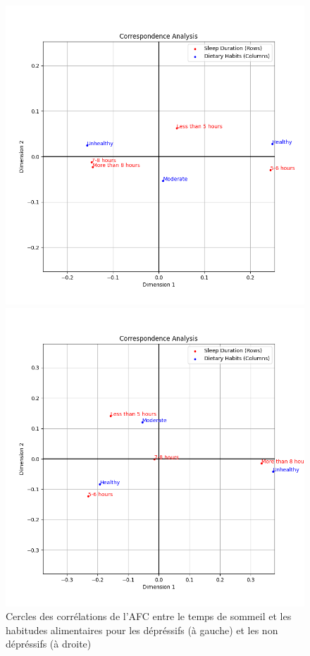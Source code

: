 \begin{figure}[!h]
  \centering
  \begin{minipage}{0.45\textwidth}
    \centering
    \includegraphics[width=\linewidth]{Images/Sleep_Dietary_depressive/Corr_circle.png}
  \end{minipage}\hfill
  \begin{minipage}{0.45\textwidth}
    \centering
    \includegraphics[width=\linewidth]{Images/Sleep_Dietary_non_depressive/Corr_circle.png}
  \end{minipage}  
  \caption{Cercles des corrélations de l'AFC entre le temps de sommeil et les habitudes alimentaires pour les dépréssifs (à gauche) et les non dépréssifs (à droite)}\label{fig:corrDietarySleep}
\end{figure}


